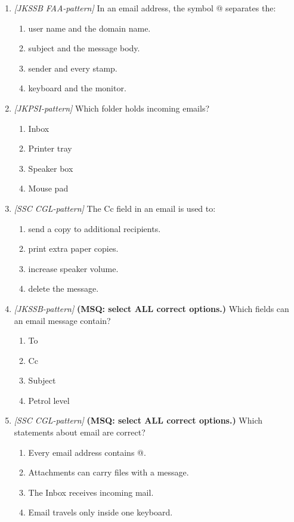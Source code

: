 \documentclass[11pt]{article}
\begin{document}
\begin{enumerate}[label=\textbf{Q\arabic*.}, leftmargin=*]
\item \textit{[JKSSB FAA-pattern]} In an email address, the symbol @ separates the:
  \begin{enumerate}[label=\Alph*.]
    \item user name and the domain name.
    \item subject and the message body.
    \item sender and every stamp.
    \item keyboard and the monitor.
  \end{enumerate}
\item \textit{[JKPSI-pattern]} Which folder holds incoming emails?
  \begin{enumerate}[label=\Alph*.]
    \item Inbox
    \item Printer tray
    \item Speaker box
    \item Mouse pad
  \end{enumerate}
\item \textit{[SSC CGL-pattern]} The Cc field in an email is used to:
  \begin{enumerate}[label=\Alph*.]
    \item send a copy to additional recipients.
    \item print extra paper copies.
    \item increase speaker volume.
    \item delete the message.
  \end{enumerate}
\item \textit{[JKSSB-pattern]} \textbf{(MSQ: select ALL correct options.)} Which fields can an email message contain?
  \begin{enumerate}[label=\Alph*.]
    \item To
    \item Cc
    \item Subject
    \item Petrol level
  \end{enumerate}
\item \textit{[SSC CGL-pattern]} \textbf{(MSQ: select ALL correct options.)} Which statements about email are correct?
  \begin{enumerate}[label=\Alph*.]
    \item Every email address contains @.
    \item Attachments can carry files with a message.
    \item The Inbox receives incoming mail.
    \item Email travels only inside one keyboard.
  \end{enumerate}
\end{enumerate}
\def\JKSSBLessonID{37}\def\JKSSBAnswers{0}
\end{document}
